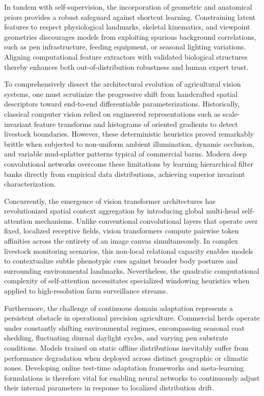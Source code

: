 \documentclass[Times,12pt,oneside,openany,print,index]{report}
\begin{document}
In tandem with self-supervision, the incorporation of geometric and anatomical priors provides a robust safeguard against shortcut learning. Constraining latent features to respect physiological landmarks, skeletal kinematics, and viewpoint geometries discourages models from exploiting spurious background correlations, such as pen infrastructure, feeding equipment, or seasonal lighting variations. Aligning computational feature extractors with validated biological structures thereby enhances both out-of-distribution robustness and human expert trust.

To comprehensively dissect the architectural evolution of agricultural vision systems, one must scrutinize the progressive shift from handcrafted spatial descriptors toward end-to-end differentiable parameterizations. Historically, classical computer vision relied on engineered representations such as scale-invariant feature transforms and histograms of oriented gradients to detect livestock boundaries. However, these deterministic heuristics proved remarkably brittle when subjected to non-uniform ambient illumination, dynamic occlusion, and variable mud-splatter patterns typical of commercial barns. Modern deep convolutional networks overcome these limitations by learning hierarchical filter banks directly from empirical data distributions, achieving superior invariant characterization.

Concurrently, the emergence of vision transformer architectures has revolutionized spatial context aggregation by introducing global multi-head self-attention mechanisms. Unlike conventional convolutional layers that operate over fixed, localized receptive fields, vision transformers compute pairwise token affinities across the entirety of an image canvas simultaneously. In complex livestock monitoring scenarios, this non-local relational capacity enables models to contextualize subtle phenotypic cues against broader body postures and surrounding environmental landmarks. Nevertheless, the quadratic computational complexity of self-attention necessitates specialized windowing heuristics when applied to high-resolution farm surveillance streams.

Furthermore, the challenge of continuous domain adaptation represents a persistent obstacle in operational precision agriculture. Commercial herds operate under constantly shifting environmental regimes, encompassing seasonal coat shedding, fluctuating diurnal daylight cycles, and varying pen substrate conditions. Models trained on static offline distributions inevitably suffer from performance degradation when deployed across distinct geographic or climatic zones. Developing online test-time adaptation frameworks and meta-learning formulations is therefore vital for enabling neural networks to continuously adjust their internal parameters in response to localized distribution drift.
\end{document}
